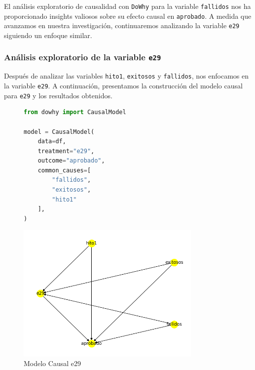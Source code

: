 El análisis exploratorio de causalidad con \texttt{DoWhy} para la variable \texttt{fallidos} nos ha proporcionado insights valiosos sobre su efecto causal en \texttt{aprobado}. A medida que avanzamos en nuestra investigación, continuaremos analizando la variable \texttt{e29} siguiendo un enfoque similar.

\subsubsection{Análisis exploratorio de la variable \texttt{e29}}

Después de analizar las variables \texttt{hito1}, \texttt{exitosos} y \texttt{fallidos}, nos enfocamos en la variable \texttt{e29}. A continuación, presentamos la construcción del modelo causal para \texttt{e29} y los resultados obtenidos.

\begin{figure}[H]
    \centering
    \begin{minipage}{0.48\textwidth}
        \begin{lstlisting}[language=Python, caption=Modelo causal e29, label=lst:model_causalE29]
from dowhy import CausalModel

model = CausalModel(
    data=df,
    treatment="e29",
    outcome="aprobado",
    common_causes=[
        "fallidos",
        "exitosos",
        "hito1"
    ],
)
        \end{lstlisting}
    \end{minipage}
    \hfill
    \begin{minipage}{0.48\textwidth}
        \centering
        \includegraphics[width=0.8\textwidth]{img/causalidad/graph_causal_model_e29.png}
        \caption{Modelo Causal e29}
        \label{fig:modelo_causal_e29}
    \end{minipage}
\end{figure}


